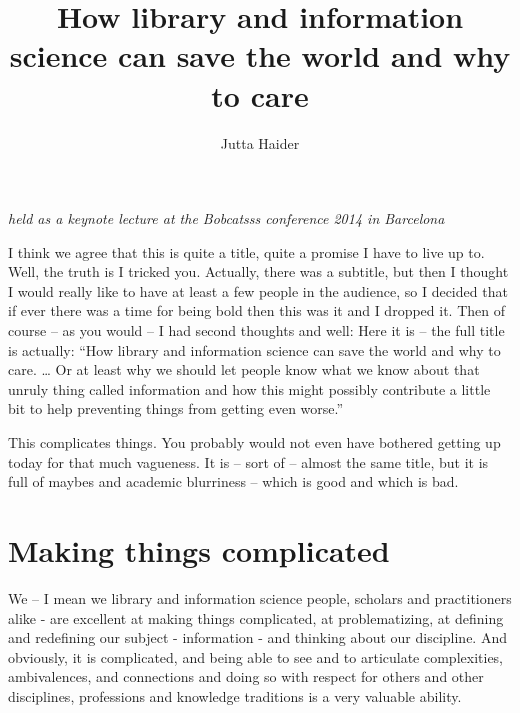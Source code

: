 \documentclass[a4paper,
fontsize=11pt,
oneside,
numbers=noperiodatend,
parskip=half-,
bibliography=totoc,
final
]{scrartcl}
\title{\LARGE{How library and information science can save the world and why to care}} %
\author{Jutta Haider} %
\date{}
\begin{document}
\maketitle
\thispagestyle{fancyplain} 


\emph{held as a keynote lecture at the Bobcatsss conference 2014 in
Barcelona}

I think we agree that this is quite a title, quite a promise I have to
live up to. Well, the truth is I tricked you. Actually, there was a
subtitle, but then I thought I would really like to have at least a few
people in the audience, so I decided that if ever there was a time for
being bold then this was it and I dropped it. Then of course -- as you
would -- I had second thoughts and well: Here it is -- the full title is
actually: \enquote{How library and information science can save the
world and why to care. \ldots{} Or at least why we should let people
know what we know about that unruly thing called information and how
this might possibly contribute a little bit to help preventing things
from getting even worse.}

This complicates things. You probably would not even have bothered
getting up today for that much vagueness. It is -- sort of -- almost the
same title, but it is full of maybes and academic blurriness -- which is
good and which is bad.

\section*{Making things
complicated}\label{making-things-complicated}

We -- I mean we library and information science people, scholars and
practitioners alike - are excellent at making things complicated, at
problematizing, at defining and redefining our subject - information -
and thinking about our discipline. And obviously, it is complicated, and
being able to see and to articulate complexities, ambivalences, and
connections and doing so with respect for others and other disciplines,
professions and knowledge traditions is a very valuable ability.
\end{document}
